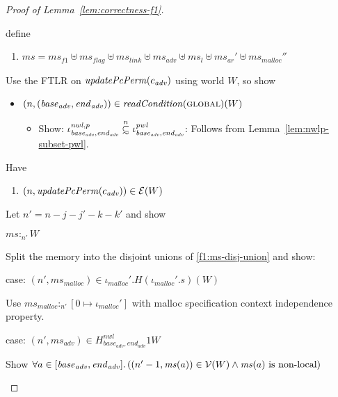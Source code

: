 \documentclass[a4paper]{article}
\newcommand\subsetsim{\mathrel{\ooalign{\raise.2ex\hbox{$\subset$}\cr
      \hidewidth\lower.8ex\hbox{\scalebox{0.9}{$\sim$}}\hidewidth\cr}}}
\newcommand{\nsubsim}[1][n]{\stackrel{\tiny{#1}}{\subsetsim}}
\newcommand{\var}[1]{\mathit{#1}}
\newcommand{\hs}{\var{ms}}
\newcommand{\ms}{\hs}
\newcommand{\start}{\var{base}}
\newcommand{\addrend}{\var{end}}
\newcommand{\heap}{\var{mem}}
\newcommand{\adv}{\var{adv}}
\newcommand{\flag}{\var{flag}}
\newcommand{\nwl}{\var{nwl}}
\newcommand{\pwl}{\var{pwl}}
\newcommand{\plainfun}[2]{
  \ifthenelse{\equal{#2}{}}
  {\mathit{#1}}
  {\mathit{#1}(#2)}
}
\newcommand{\updatePcPerm}[1]{\plainfun{updatePcPerm}{#1}}
\newcommand{\readCond}[1]{\plainfun{readCondition}{#1}}
\newcommand{\heapSat}[3][\heap]{#1 :_{#2} #3}
\newcommand{\codelabel}[1]{\mathit{#1}}
\newcommand{\malloc}{\codelabel{malloc}}
\newcommand{\asmType}{\plaindom{AsmType}}
\newcommand{\plaindom}[1]{\mathrm{#1}}
\newcommand{\intr}[2]{\mathcal{#1}}
\newcommand{\valueintr}[1]{\intr{V}{#1}}
\newcommand{\exprintr}[1]{\intr{E}{#1}}
\newcommand{\stdvr}{\valueintr{\asmType}}
\newcommand{\stder}{\exprintr{\asmType}}
\newcommand{\npair}[2][n]{\left(#1,#2 \right)}
\newcommand{\plainperm}[1]{\textsc{#1}}
\newcommand{\glob}{\plainperm{global}}
\newcommand{\nonlocal}[1]{\ensuremath{#1} \text{ is non-local}}
\begin{document}
\begin{proof}[Proof of Lemma~\ref{lem:correctness-f1}]
\begin{itemize}
  \end{itemize}
  define
  \begin{enumerate}
  \item $\ms = \hs_{f1} \uplus 
    \hs_\flag \uplus                
    \ms_{\var{link}} \uplus 
    \hs_\adv \uplus 
    \ms_{l} \uplus
    \ms_{\var{ar}}' \uplus
    \ms_{\malloc}'' $ \label{f1:ms-disj-union}
  \end{enumerate}
  Use the FTLR on $\updatePcPerm{c_{\var{adv}}}$ using world $W$, so show
  \begin{itemize}
  \item $\npair{(\start_{\adv},\addrend_{\adv})} \in \readCond{}(\glob)(W)$
    \begin{itemize}
    \item Show: $\iota^{\nwl,p}_{\start_\adv,\addrend_\adv} \nsubsim[n] \iota^\pwl_{\start_\adv,\addrend_\adv}$: Follows from Lemma~\ref{lem:nwlp-subset-pwl}.
    \end{itemize}
  \end{itemize}
  Have
  \begin{enumerate}[resume]
  \item $\npair{\updatePcPerm{c_{\var{adv}}}} \in \stder(W)$
  \end{enumerate}
  Let $n' = n - j - j'-k-k'$ and show
  \begin{enumproof}[resume]
  \item $\heapSat[\ms]{n'}{W}$
    \begin{enumproof}
    \item Split the memory into the disjoint unions of \ref{f1:ms-disj-union} and show:
      \begin{enumproof}
      \item case: $\npair[n']{\ms_\malloc} \in \iota_\malloc'.H (\iota_\malloc'.s) (W)$ 
        \begin{enumproof}
        \item Use $\heapSat[\ms_\malloc]{n'}{[0 \mapsto \iota_\malloc']}$ with malloc specification context independence property.
        \end{enumproof}
      \item case: $\npair[n']{\ms_\adv} \in H^\nwl_{\start_\adv,\addrend_\adv} 1 W$ \label{lem:f1-adv-mem-sat}
        \begin{enumproof}
        \item Show $\forall a \in [\start_\adv,\addrend_\adv] \ldotp (\npair[n'-1]{\ms(a)} \in \stdvr(W) \land \nonlocal{\ms(a)})$
        \end{enumproof}

\end{enumproof}
\end{enumproof}
\end{enumproof}
\end{proof}
\end{document}
